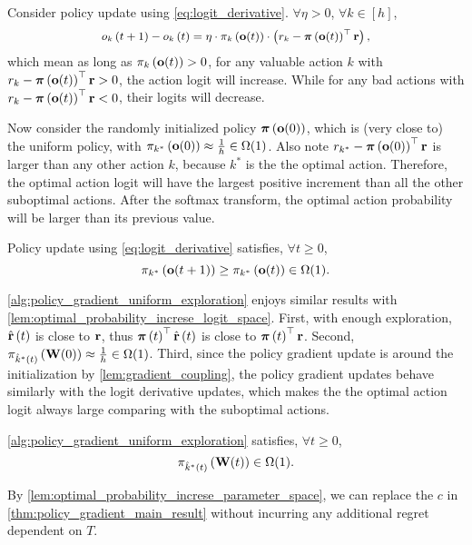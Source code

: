 Consider policy update using \cref{eq:logit_derivative}. $\forall \eta > 0$, $\forall k \in [h]$,
\begin{equation*}
\label{eq:logit_increment_logit_space}
\begin{split}
\small
    o_{k}\left( t+1 \right) - o_{k}\left( t \right) = \eta \cdot \pi_{k}\left( \rvo(t)\right) \cdot \left( r_{k} - \rvpi\left( \rvo(t) \right)^\top \rvr \right),
\end{split}
\end{equation*}
which mean as long as $\pi_{k}\left( {\mathbf{o}}(t)\right) > 0$, for any valuable action $k$ with $r_k -  {\boldsymbol{\pi}}\left( {\mathbf{o}}(t) \right)^\top {\mathbf{r}} > 0$, the action logit will increase. While for any bad actions with $r_k -  {\boldsymbol{\pi}}\left( {\mathbf{o}}(t) \right)^\top {\mathbf{r}} < 0$, their logits will decrease.

Now consider the randomly initialized policy ${\boldsymbol{\pi}}\left( {\mathbf{o}}(0) \right)$, which is (very close to) the uniform policy, with $\pi_{k^*}\left( {\mathbf{o}}(0)\right) \approx \frac{1}{h} \in \Omega(1)$. Also note $r_{k^*} - {\boldsymbol{\pi}}\left( {\mathbf{o}}(0) \right)^\top {\mathbf{r}}$ is larger than any other action $k$, because $k^*$ is the the optimal action. Therefore, the optimal action logit will have the largest positive increment than all the other suboptimal actions. After the softmax transform, the optimal action probability will be larger than its previous value. 
\begin{lem}
\label{lem:optimal_probability_increse_logit_space}
Policy update using \cref{eq:logit_derivative} satisfies, $\forall t \ge 0$,
\begin{equation*}
    \pi_{k^*}\left( {\mathbf{o}}(t+1)\right) \ge \pi_{k^*}\left( {\mathbf{o}}(t)\right) \in \Omega(1).
\end{equation*}
\end{lem}

\cref{alg:policy_gradient_uniform_exploration} enjoys similar results with \cref{lem:optimal_probability_increse_logit_space}. First, with enough exploration, $\hat{{\mathbf{r}}}\left(t\right)$ is close to ${\mathbf{r}}$, thus ${\boldsymbol{\pi}}\left(t\right)^\top \hat{{\mathbf{r}}}\left(t\right)$ is close to ${\boldsymbol{\pi}}\left(t\right)^\top {\mathbf{r}}$. Second, $\pi_{\hat{k}^*\left(t\right)}\left( {\mathbf{W}}(0)\right) \approx \frac{1}{h} \in \Omega(1)$. Third, since the policy gradient update is around the initialization by \cref{lem:gradient_coupling}, the policy gradient updates behave similarly with the logit derivative updates, which makes the the optimal action logit always large comparing with the suboptimal actions.
\begin{lem}
\label{lem:optimal_probability_increse_parameter_space}
\cref{alg:policy_gradient_uniform_exploration} satisfies, $\forall t \ge 0$,
\begin{equation*}
    \pi_{\hat{k}^*\left(t\right)}\left( {\mathbf{W}}(t)\right) \in \Omega(1).
\end{equation*}
\end{lem}
By \cref{lem:optimal_probability_increse_parameter_space}, we can replace the $c$ in \cref{thm:policy_gradient_main_result} without incurring any additional regret dependent on $T$.

